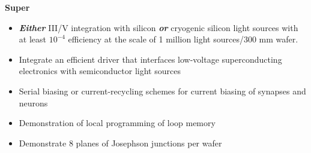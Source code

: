 \documentclass[twocolumn]{article}
\begin{document}
\textbf{Super}
\begin{itemize}
    \item \textbf{\textit{Either} }III/V integration with silicon \textbf{\textit{or}} cryogenic silicon light sources with at least $10^{-4}$ efficiency at the scale of 1 million light sources/300 mm wafer.
    \item Integrate an efficient driver that interfaces low-voltage superconducting electronics with semiconductor light sources
    \item Serial biasing or current-recycling schemes for current biasing of synapses and neurons
    \item Demonstration of local programming of loop memory
    \item Demonstrate 8 planes of Josephson junctions per wafer
    
\end{itemize}







\end{document}

